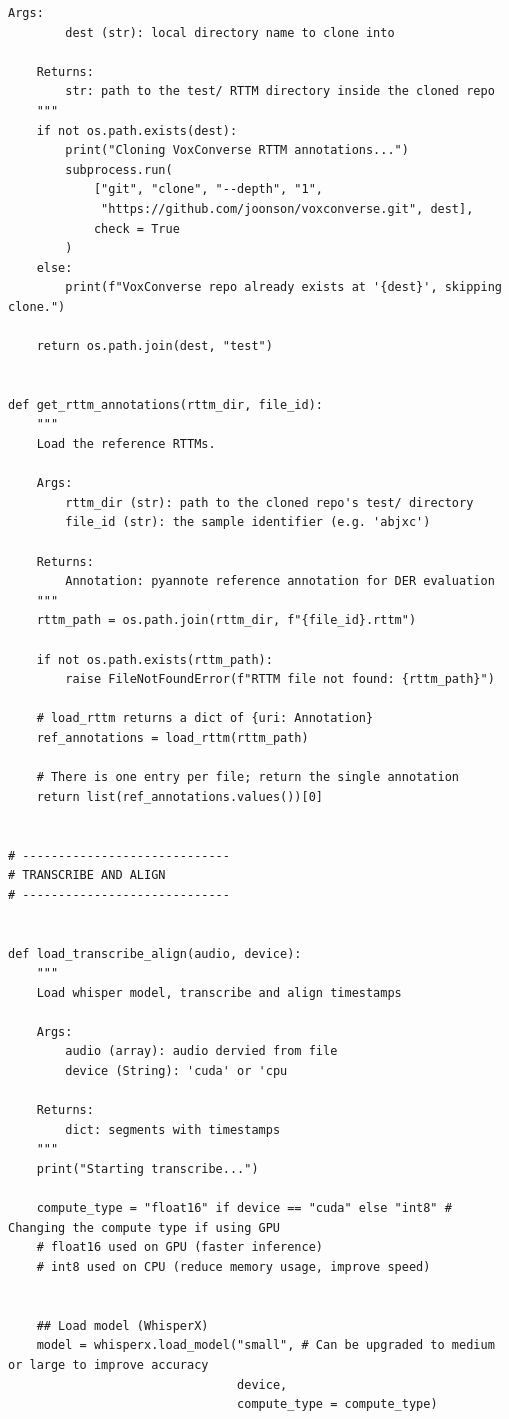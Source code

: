 \documentclass{article}
\begin{document}
\begin{lstlisting}[style=pythonstyle, caption={Simple Diarization (No LLM)}]
    Args:
        dest (str): local directory name to clone into
 
    Returns:
        str: path to the test/ RTTM directory inside the cloned repo
    """
    if not os.path.exists(dest):
        print("Cloning VoxConverse RTTM annotations...")
        subprocess.run(
            ["git", "clone", "--depth", "1",
             "https://github.com/joonson/voxconverse.git", dest],
            check = True
        )
    else:
        print(f"VoxConverse repo already exists at '{dest}', skipping clone.")
 
    return os.path.join(dest, "test")


def get_rttm_annotations(rttm_dir, file_id):
    """
    Load the reference RTTMs.
 
    Args:
        rttm_dir (str): path to the cloned repo's test/ directory
        file_id (str): the sample identifier (e.g. 'abjxc')
 
    Returns:
        Annotation: pyannote reference annotation for DER evaluation
    """
    rttm_path = os.path.join(rttm_dir, f"{file_id}.rttm")
 
    if not os.path.exists(rttm_path):
        raise FileNotFoundError(f"RTTM file not found: {rttm_path}")
 
    # load_rttm returns a dict of {uri: Annotation}
    ref_annotations = load_rttm(rttm_path)
 
    # There is one entry per file; return the single annotation
    return list(ref_annotations.values())[0]


# -----------------------------
# TRANSCRIBE AND ALIGN
# -----------------------------


def load_transcribe_align(audio, device):
    """ 
    Load whisper model, transcribe and align timestamps

    Args:
        audio (array): audio dervied from file
        device (String): 'cuda' or 'cpu

    Returns:
        dict: segments with timestamps
    """
    print("Starting transcribe...")

    compute_type = "float16" if device == "cuda" else "int8" # Changing the compute type if using GPU
    # float16 used on GPU (faster inference)
    # int8 used on CPU (reduce memory usage, improve speed)


    ## Load model (WhisperX)
    model = whisperx.load_model("small", # Can be upgraded to medium or large to improve accuracy
                                device,
                                compute_type = compute_type)


\end{lstlisting}
\end{document}
